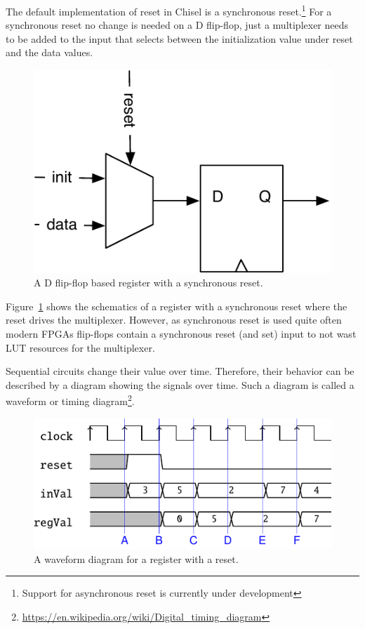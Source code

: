 \documentclass[%
    10pt,
    headinclude, footexclude,
    openright, %
    notitlepage,
    cleardoubleempty,
    headsepline,
    pointlessnumbers,
    bibtotoc, idxtotoc,
    ]{scrbook}
\newcommand{\scale}{0.7}
\newcommand{\todo}[1]{{\emph{TODO: #1}}}
\newcommand{\myref}[2]{\href{#1}{#2}}
\renewcommand{\myref}[2]{{#2}{\footnote{\url{#1}}}}
\renewcommand{\todo}[1]{}
\begin{document}

The default implementation of reset in Chisel is a synchronous
reset.\footnote{Support for asynchronous reset is currently under development}
For a synchronous reset no change is needed on a D flip-flop, just a multiplexer
needs to be added to the input that selects between the initialization value under
reset and the data values.


\begin{figure}
  \centering
  \includegraphics[scale=\scale]{figures/register-reset}
  \caption{A D flip-flop based register with a synchronous reset.}
  \label{fig:register-reset}
\end{figure}

Figure~\ref{fig:register-reset} shows the schematics of a register with a synchronous reset
where the reset drives the multiplexer. However, as synchronous reset is used quite often
modern FPGAs flip-flops contain a synchronous reset (and set) input to not wast LUT
resources for the multiplexer.

Sequential circuits change their value over time. Therefore, their behavior can be described
by a diagram showing the signals over time. Such a diagram is called a waveform or
\myref{https://en.wikipedia.org/wiki/Digital_timing_diagram}{timing diagram}.

\todo{from Luca: Do readers know about timing diagrams?}

\begin{figure}
  \centering
  \includegraphics[scale=1]{figures/reg_wave}
  \caption{A waveform diagram for a register with a reset.}
  \label{fig:register-wave}
\end{figure}
\end{document}

